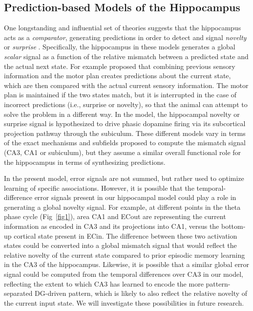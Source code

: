 \documentclass[10pt,letterpaper]{article}
\begin{document}
\subsection*{Prediction-based Models of the Hippocampus}

One longstanding and influential set of theories suggests that the hippocampus acts as a \emph{comparator}, generating predictions in order to detect and signal \emph{novelty} or \emph{surprise} \cite{Gray82,Vinogradova01,LismanGrace05}.  Specifically, the hippocampus in these models generates a global \emph{scalar} signal as a function of the relative mismatch between a predicted state and the actual next state.  For example \cite{Gray82} proposed that combining previous sensory information and the motor plan creates predictions about the current state, which are then compared with the actual current sensory information.  The motor plan is maintained if the two states match, but it is interrupted in the case of incorrect predictions (i.e., surprise or novelty), so that the animal can attempt to solve the problem in a different way.  In the \cite{LismanGrace05} model, the hippocampal novelty or surprise signal is hypothesized to drive phasic dopamine firing via its subcortical projection pathway through the subiculum. These different models vary in terms of the exact mechanisms and subfields proposed to compute the mismatch signal (CA3, CA1 or subiculum), but they assume a similar overall functional role for the hippocampus in terms of synthesizing predictions. 

In the present model, error signals are not summed, but rather used to optimize learning of specific associations.  However, it is possible that the temporal-difference error signals present in our hippocampal model could play a role in generating a global novelty signal.  For example, at different points in the theta phase cycle (Fig~\ref{fig1}), area CA1 and ECout are representing the current information as encoded in CA3 and its projections into CA1, versus the bottom-up cortical state present in ECin. The difference between these two activation states could be converted into a global mismatch signal that would reflect the relative novelty of the current state compared to prior episodic memory learning in the CA3 of the hippocampus.  Likewise, it is possible that a similar global error signal could be computed from the temporal differences over CA3 in our model, reflecting the extent to which CA3 has learned to encode the more pattern-separated DG-driven pattern, which is likely to also reflect the relative novelty of the current input state.  We will investigate these possibilities in future research. 
\end{document}
